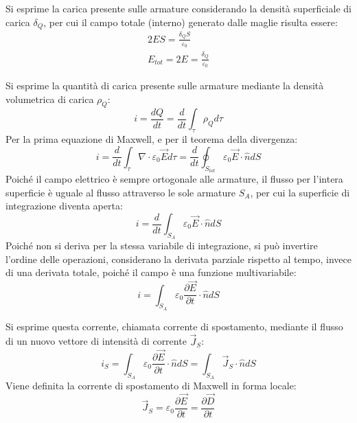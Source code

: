 \documentclass{article}
\numberwithin{equation}{subsection}
\begin{document}
Si esprime la carica presente sulle armature considerando la densità superficiale di carica $\delta_Q$, per cui il campo totale (interno) generato dalle maglie risulta essere:
\begin{gather*}
    2ES=\displaystyle\frac{\delta_QS}{\varepsilon_0}\\
    E_{tot}=2E=\displaystyle\frac{\delta_Q}{\varepsilon_0}
\end{gather*}


Si esprime la quantità di carica presente sulle armature mediante la densità volumetrica di carica $\rho_Q$:
\begin{equation*}
    i=\displaystyle\frac{dQ}{dt}=\frac{d}{dt}\int_{\tau}\rho_Qd\tau
\end{equation*}
Per la prima equazione di Maxwell, e per il teorema della divergenza: 
\begin{equation*}
    i=\displaystyle\frac{d}{dt}\int_{\tau}\nabla\cdot\varepsilon_0\vec{E}d\tau=\frac{d}{dt}\oint_{S_{tot}}\varepsilon_0\vec{E}\cdot\hat{n}dS
\end{equation*}
Poiché il campo elettrico è sempre ortogonale alle armature, il flusso per l'intera superficie è uguale al flusso attraverso le sole armature $S_A$, per cui la superficie 
di integrazione diventa aperta:
\begin{equation*}
    i=\displaystyle\frac{d}{dt}\int_{S_A}\varepsilon_0\vec{E}\cdot\hat{n}dS
\end{equation*}
Poiché non si deriva per la stessa variabile di integrazione, si può invertire l'ordine delle operazioni, considerano la derivata parziale rispetto al tempo, invece di una 
derivata totale, poiché il campo è una funzione multivariabile:
\begin{equation*}
    i=\displaystyle\int_{S_A}\varepsilon_0\frac{\partial \vec{E}}{\partial t}\cdot\hat{n}dS
\end{equation*}

Si esprime questa corrente, chiamata corrente di spostamento, mediante il flusso di un nuovo vettore di intensità di corrente $\vec{J}_S$:
\begin{equation*}
    i_S=\displaystyle\int_{S_A}\varepsilon_0\frac{\partial \vec{E}}{\partial t}\cdot\hat{n}dS=\int_{S_A}\vec{J}_S\cdot\hat{n}dS
\end{equation*}
Viene definita la corrente di spostamento di Maxwell in forma locale:
\begin{equation}
    \vec{J}_S=\displaystyle\varepsilon_0\frac{\partial \vec{E}}{\partial t}=\frac{\partial \vec{D}}{\partial t}
\end{equation}
\end{document}
